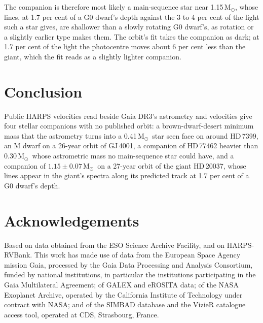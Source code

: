 \documentclass[3p,11pt]{elsarticle}
\newcommand{\Msun}{M$_\odot$}
\begin{document}
The companion is therefore most likely a main-sequence star near 1.15\,\Msun, whose lines, at
1.7 per cent of a G0 dwarf's depth against the 3 to 4 per cent of the light such a star gives, are
shallower than a slowly rotating G0 dwarf's, as rotation or a slightly earlier type makes them.
The orbit's fit takes the companion as dark; at 1.7 per cent of the light the photocentre moves
about 6 per cent less than the giant, which the fit reads as a slightly lighter companion.

\section{Conclusion}\label{sec:conclusion}

Public HARPS velocities read beside Gaia DR3's astrometry and velocities give four stellar
companions with no published orbit: a brown-dwarf-desert minimum mass that the astrometry turns
into a 0.41\,\Msun\ star seen face on around HD\,7399, an M dwarf on a 26-year orbit of GJ\,4001,
a companion of HD\,77462 heavier than 0.30\,\Msun\ whose astrometric mass no main-sequence star
could have, and a companion of $1.15 \pm 0.07$\,\Msun\ on a 27-year orbit of the giant HD\,20037,
whose lines appear in the giant's spectra along its predicted track at 1.7 per cent of a G0
dwarf's depth.

\section*{Acknowledgements}

Based on data obtained from the ESO Science Archive Facility, and on HARPS-RVBank. This work has
made use of data from the European Space Agency mission Gaia, processed by the Gaia Data
Processing and Analysis Consortium, funded by national institutions, in particular the
institutions participating in the Gaia Multilateral Agreement; of GALEX and eROSITA data; of the NASA Exoplanet Archive,
operated by the California Institute of Technology under contract with NASA; and of the SIMBAD
database and the VizieR catalogue access tool, operated at CDS, Strasbourg, France.
\end{document}
